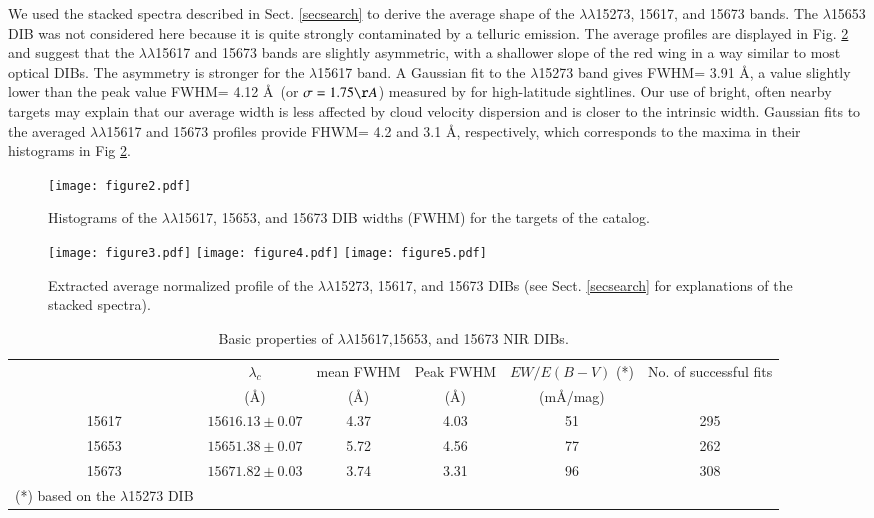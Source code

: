 \documentclass[printer]{aa} %
\begin{document}
We used the stacked spectra described in Sect. \ref{secsearch} to derive the average shape of the $\lambda\lambda$15273, 15617, and 15673 bands. The $\lambda$15653 DIB was not considered here because it is quite strongly contaminated by a telluric emission. The average profiles are displayed in Fig. \ref{profile15617} and suggest that the $\lambda\lambda$15617 and 15673 bands are slightly asymmetric, with a shallower slope of the red wing in a way similar to most optical DIBs. The asymmetry is stronger for the $\lambda$15617 band. 
A Gaussian fit to the $\lambda$15273 band gives FWHM= 3.91 \AA, a value slightly lower than the peak value FWHM= 4.12 \AA\ (or $\sigma= 1.75 \AA$) measured by \cite{Zasowski15} for high-latitude sightlines. Our use of bright, often nearby targets may explain that our average width is less affected by cloud velocity dispersion and is closer to the intrinsic width. Gaussian fits to the averaged $\lambda\lambda$15617 and 15673 profiles provide FHWM= 4.2 and 3.1 \AA, respectively, which corresponds to the maxima in their histograms in Fig \ref{profile15617}.

\begin{figure}[!htb]
 \centering
  \texttt{[image: figure2.pdf]}
  \caption{Histograms of the $\lambda\lambda$15617, 15653, and
15673 DIB widths (FWHM) for the targets of the catalog.}
         \label{hist}
   \end{figure}

\begin{figure}[!htb]
\centering
\texttt{[image: figure3.pdf]}
\texttt{[image: figure4.pdf]}
 \texttt{[image: figure5.pdf]}
\caption{\label{profile15617} Extracted average normalized profile of the $\lambda\lambda$15273, 15617, and 15673 DIBs (see Sect. \ref{secsearch} for explanations of the stacked spectra).}
\end{figure}


\begin{table*}[ht]
\caption{Basic properties of $\lambda\lambda$15617,15653, and
15673 NIR DIBs.}             
\label{tabstatis}   
\centering                         
\begin{tabular}{c c c c c c}        
\hline\hline                 
     & $\lambda_c$ & mean FWHM  & Peak FWHM & $EW/E(B-V)$ (*)  &  No. \:of successful fits \\   
     & (\AA) & (\AA) & (\AA)& (m\AA /mag) & \\    
\hline                        
15617 & $15616.13 \pm 0.07$ & 4.37 & 4.03 &  51 & 295 \\
15653 &  $15651.38 \pm 0.07$ & 5.72 & 4.56 & 77 & 262 \\
15673 & $15671.82 \pm 0.03$ & 3.74 & 3.31 &  96 & 308 \\

\hline            
(*) based on the $\lambda$15273 DIB
                     
\end{tabular}
\end{table*}
\end{document}
